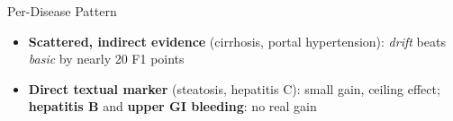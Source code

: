 \documentclass[9pt]{beamer}
\begin{document}
    \begin{frame}{Per-Disease Pattern}
        \begin{center}
            \resizebox{0.94\textwidth}{!}{}
        \end{center}
        \footnotesize
        \begin{itemize}
            \itemsep1pt
            \item \textbf{Scattered, indirect evidence} (cirrhosis, portal hypertension): \textit{drift} beats \textit{basic} by nearly 20 F1 points
            \item \textbf{Direct textual marker} (steatosis, hepatitis C): small gain, ceiling effect; \textbf{hepatitis B} and \textbf{upper GI bleeding}: no real gain
        \end{itemize}
    \end{frame}

\end{document}
